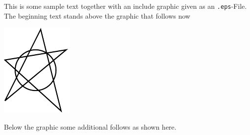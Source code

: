 \documentclass{article}
\begin{document}
This is some sample text together with an include graphic given as an 
\texttt{.eps}-File. The beginning text stands above the graphic that
follows now

\includegraphics{demo}

Below the graphic some additional follows as shown here.
\end{document}

